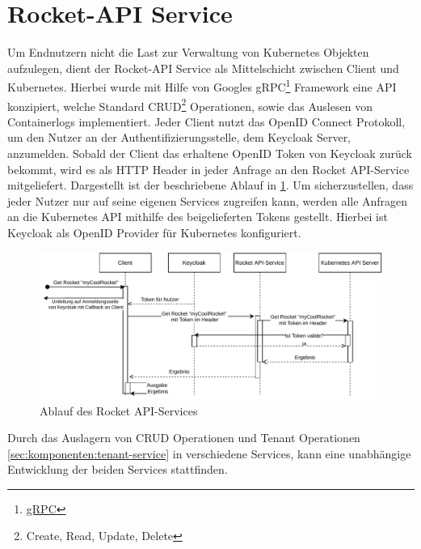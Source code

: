 \section{Rocket-API Service}
\label{sec:komponenten:rocket-api-service}
Um Endnutzern nicht die Last zur Verwaltung von Kubernetes Objekten aufzulegen, dient der Rocket-API Service als Mittelschicht zwischen
Client und Kubernetes. Hierbei wurde mit Hilfe von Googles gRPC\footnote{\href{https://grpc.io/}{gRPC}} Framework
eine API konzipiert, welche Standard CRUD\footnote{Create, Read, Update, Delete} Operationen, sowie das Auslesen
von Containerlogs implementiert.
Jeder Client nutzt das OpenID Connect Protokoll, um den Nutzer an der Authentifizierungsstelle, dem Keycloak
Server, anzumelden. Sobald der Client das erhaltene OpenID Token von Keycloak zurück bekommt,
wird es als HTTP Header in jeder Anfrage an den Rocket API-Service mitgeliefert.
Dargestellt ist der beschriebene Ablauf in \ref{fig:rocket-api-service-flow}.
Um sicherzustellen, dass jeder Nutzer nur auf seine eigenen Services zugreifen kann, 
werden alle Anfragen an die Kubernetes API mithilfe des beigelieferten Tokens gestellt.
Hierbei ist Keycloak als OpenID Provider für Kubernetes konfiguriert.

\begin{figure}[h]
  \centering
  \includegraphics[height=0.5\textwidth]{gfx/chapters/3_komponenten/api-service-flow.pdf}
  \caption{Ablauf des Rocket API-Services}
  \label{fig:rocket-api-service-flow}
\end{figure}

Durch das Auslagern von CRUD Operationen und Tenant Operationen \ref{sec:komponenten:tenant-service} in
verschiedene Services, kann eine unabhängige Entwicklung der beiden Services stattfinden.